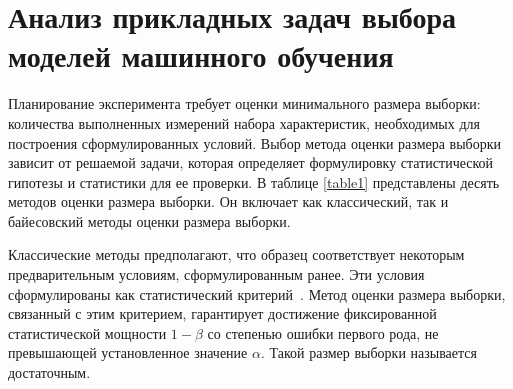 \chapter{Анализ прикладных задач выбора моделей машинного обучения}
Планирование эксперимента требует оценки минимального размера выборки: количества выполненных измерений набора характеристик, необходимых для построения сформулированных условий. Выбор метода оценки размера выборки зависит от решаемой задачи, которая определяет формулировку статистической гипотезы и статистики для ее проверки. В таблице \ref{table1} представлены десять методов оценки размера выборки. Он включает как классический, так и байесовский методы оценки размера выборки.

Классические методы предполагают, что образец соответствует некоторым предварительным условиям, сформулированным ранее. Эти условия сформулированы как статистический критерий~\cite{self1988,self1992,shieh2000,demidenko2007}. Метод оценки размера выборки, связанный с этим критерием, гарантирует достижение фиксированной статистической мощности $1-\beta$ со степенью ошибки первого рода, не превышающей установленное значение $\alpha$. Такой размер выборки называется достаточным.

